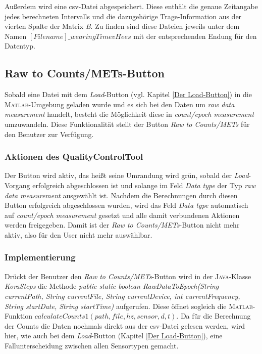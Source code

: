 \documentclass[onecolumn,german]{article}
\begin{document}
Außerdem wird eine csv-Datei abgespeichert. Diese enthält die genaue Zeitangabe jedes berechneten Intervalls und die dazugehörige Trage-Information aus der vierten Spalte der Matrix \textit{B}. Zu finden sind diese Dateien jeweils unter dem Namen {$[Filename]\_wearingTimevHees$} mit der entsprechenden Endung für den Datentyp.

\subsection{Raw to Counts/METs-Button}\label{Raw to Counts/METs-Button}

Sobald eine Datei mit dem \textit{Load}-Button (vgl. Kapitel \ref{Der Load-Button}) in die \textsc{Matlab}-Umgebung geladen wurde und es sich bei den Daten um \textit{raw data measurement} handelt, besteht die Möglichkeit diese in \textit{count/epoch measurement} umzuwandeln. Diese Funktionalität stellt der Button \textit{Raw to Counts/METs} für den Benutzer zur Verfügung.\newline

\subsubsection{Aktionen des QualityControlTool}
Der Button wird aktiv, das heißt seine Umrandung wird grün, sobald der \textit{Load}-Vorgang erfolgreich abgeschlossen ist und solange im Feld \textit{Data type} der Typ \textit{raw data measurement} ausgewählt ist. Nachdem die Berechnungen durch diesen Button erfolgreich abgeschlossen wurden, wird das Feld \textit{Data type} automatisch auf \textit{count/epoch measurement} gesetzt und alle damit verbundenen Aktionen werden freigegeben. Damit ist der \textit{Raw to Counts/METs}-Button nicht mehr aktiv, also für den User nicht mehr auswählbar.

\subsubsection{Implementierung}
Drückt der Benutzer den \textit{Raw to Counts/METs}-Button wird in der \textsc{Java}-Klasse \textit{KoraSteps} die Methode \textit{public static boolean RawDataToEpoch(String currentPath, String currentFile, String currentDevice, int currentFrequency, String startDate, String startTime)} aufgerufen. Diese öffnet sogleich die \textsc{Matlab}-Funktion \textit{$calculateCounts1(path, file, hz, sensor,d,t)$}. Da für die Berechnung der Counts die Daten nochmals direkt aus der csv-Datei gelesen werden, wird hier, wie auch bei dem \textit{Load}-Button (Kapitel \ref{Der Load-Button}), eine Fallunterscheidung zwischen allen Sensortypen gemacht.\newline
\end{document}

